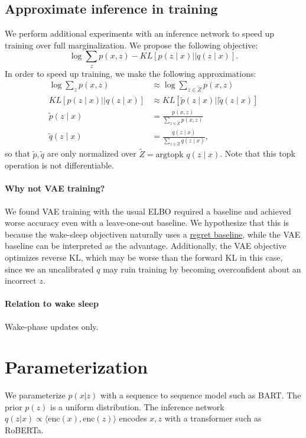 \documentclass[11pt]{article}
\begin{document}
\subsection{Approximate inference in training}
We perform additional experiments with an inference network to speed up training
over full marginalization.
We propose the following objective:
\begin{equation}
\log\sum_z p(x,z) - KL[p(z\mid x) || q(z \mid x)].
\end{equation}
In order to speed up training, we make the following approximations:
\begin{align*}
\log\sum_z p(x,z) &\approx \log\sum_{z\in \tilde{Z}} p(x,z)\\
KL[p(z\mid x) || q(z \mid x)] &\approx KL[\tilde{p}(z\mid x) || \tilde{q}(z \mid x)]\\
\tilde{p}(z\mid x) &= \frac{p(x,z)}{\sum_{z \in \tilde{Z}} p(x,z)}\\
\tilde{q}(z\mid x) &= \frac{q(z\mid x)}{\sum_{z \in \tilde{Z}} q(z\mid x)},
\end{align*}
so that $\tilde{p},\tilde{q}$ are only normalized over
$\tilde{Z} = \text{argtopk } q(z\mid x)$.
Note that this topk operation is not differentiable.

\paragraph{Why not VAE training?} We found VAE training with the usual ELBO
required a baseline and achieved worse accuracy even with a leave-one-out baseline.
We hypothesize that this is because the wake-sleep objectiven naturally uses a
\href{https://github.com/justinchiu/elbos-baselines}{regret baseline},
while the VAE baseline can be interpreted as the advantage.
Additionally, the VAE objective optimizes reverse KL, which may be worse than
the forward KL in this case, since we an uncalibrated $q$ may ruin training
by becoming overconfident about an incorrect $z$.

\paragraph{Relation to wake sleep} Wake-phase updates only.

\section{Parameterization}
We parameterize $p(x|z)$ with a sequence to sequence model such as BART.
The prior $p(z)$ is a uniform distribution.
The inference network $q(z|x) \propto \langle\text{enc}(x),\text{enc}(z)\rangle$
encodes $x,z$ with a transformer such as RoBERTa.
\end{document}
